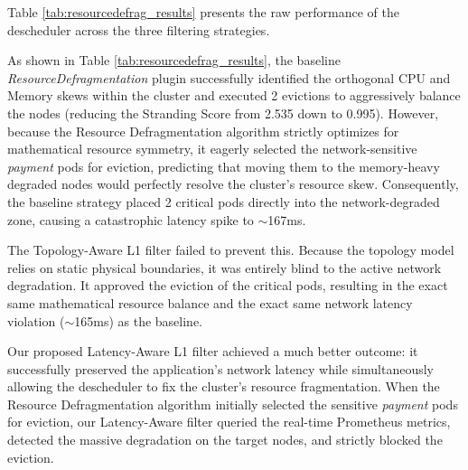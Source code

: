 Table \ref{tab:resourcedefrag_results} presents the raw performance of the descheduler across the three filtering strategies.
\begin{table}[H]
    \centering
    \caption{Descheduler Performance: ResourceDefragmentation Scenario}
    \label{tab:resourcedefrag_results}
\end{table}

As shown in Table \ref{tab:resourcedefrag_results}, the baseline \textit{ResourceDefragmentation} plugin successfully identified the orthogonal CPU and Memory skews within the cluster and executed 2 evictions to aggressively balance the nodes (reducing the Stranding Score from 2.535 down to 0.995). However, because the Resource Defragmentation algorithm strictly optimizes for mathematical resource symmetry, it eagerly selected the network-sensitive \textit{payment} pods for eviction, predicting that moving them to the memory-heavy degraded nodes would perfectly resolve the cluster's resource skew. Consequently, the baseline strategy placed 2 critical pods directly into the network-degraded zone, causing a catastrophic latency spike to $\sim$167ms.

The Topology-Aware L1 filter failed to prevent this. Because the topology model relies on static physical boundaries, it was entirely blind to the active network degradation. It approved the eviction of the critical pods, resulting in the exact same mathematical resource balance and the exact same network latency violation ($\sim$165ms) as the baseline.

Our proposed Latency-Aware L1 filter achieved a much better outcome: it successfully preserved the application's network latency while simultaneously allowing the descheduler to fix the cluster's resource fragmentation. When the Resource Defragmentation algorithm initially selected the sensitive \textit{payment} pods for eviction, our Latency-Aware filter queried the real-time Prometheus metrics, detected the massive degradation on the target nodes, and strictly blocked the eviction.


